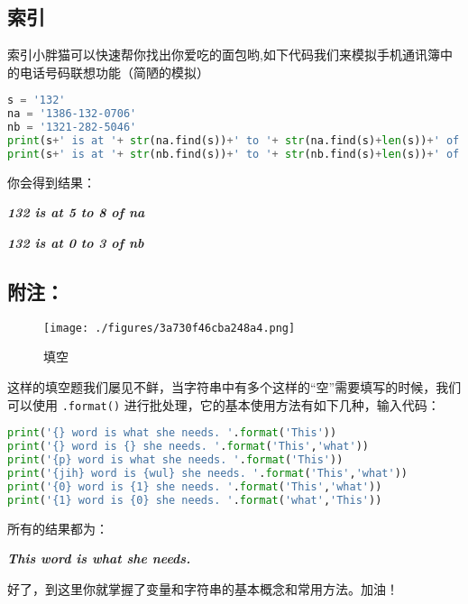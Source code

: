 \subsection{索引}
索引小胖猫可以快速帮你找出你爱吃的面包哟,如下代码我们来模拟手机通讯簿中的电话号码联想功能（简陋的模拟）

\begin{lstlisting}[language=python]
s = '132'
na = '1386-132-0706'
nb = '1321-282-5046'
print(s+' is at '+ str(na.find(s))+' to '+ str(na.find(s)+len(s))+' of na')
print(s+' is at '+ str(nb.find(s))+' to '+ str(nb.find(s)+len(s))+' of nb')
\end{lstlisting}
你会得到结果：

\textsl{\textbf{132 is at 5 to 8 of na}}

\textsl{\textbf{132 is at 0 to 3 of nb}}
\subsection{附注：}
\begin{figure}[ht]
\centering
\texttt{[image: ./figures/3a730f46cba248a4.png]}
\caption{填空} \label{fig_Strsi_2}
\end{figure}
这样的填空题我们屡见不鲜，当字符串中有多个这样的“空”需要填写的时候，我们可以使用 \verb`.format()` 进行批处理，它的基本使用方法有如下几种，输入代码：
\begin{lstlisting}[language=python]
print('{} word is what she needs. '.format('This'))
print('{} word is {} she needs. '.format('This','what'))
print('{p} word is what she needs. '.format('This'))
print('{jih} word is {wul} she needs. '.format('This','what'))
print('{0} word is {1} she needs. '.format('This','what'))
print('{1} word is {0} she needs. '.format('what','This'))
\end{lstlisting}
所有的结果都为：

\textsl{\textbf{This word is what she needs.}}

好了，到这里你就掌握了变量和字符串的基本概念和常用方法。加油！
